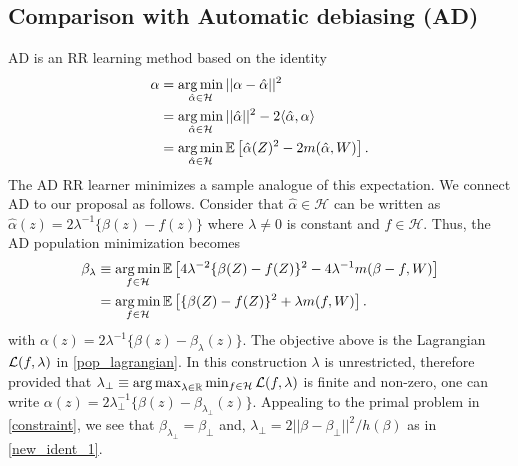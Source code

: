 

\subsection{Comparison with Automatic debiasing (AD)}

AD \citep{Chernozhukov2021, Chernozhukov2022} is an RR learning method based on the identity
\begin{align*}
    \alpha &= \operatorname*{arg\,min}_{\hat{\alpha}\in \mathcal{H}} || \alpha - \hat{\alpha}||^2 \\
    &= \operatorname*{arg\,min}_{\hat{\alpha}\in \mathcal{H}} || \hat{\alpha}||^2 -2 \langle \hat{\alpha}, \alpha \rangle \\
    &= \operatorname*{arg\,min}_{\hat{\alpha}\in \mathcal{H}} \mathbb{E}\left[\hat{\alpha}(Z)^2 - 2m(\hat{\alpha},W) \right].
\end{align*}
The AD RR learner minimizes a sample analogue of this expectation.
We connect AD to our proposal as follows. Consider that $\hat{\alpha}\in\mathcal{H}$ can be written as $\hat{\alpha}(z) = 2\lambda^{-1}\{\beta(z) - f(z)\}$ where $\lambda \neq 0$ is constant and $f\in \mathcal{H}$. Thus, the AD population minimization becomes
\begin{align*}
    \beta_\lambda &\equiv \operatorname*{arg\,min}_{f \in \mathcal{H}} \mathbb{E}\left[4\lambda^{-2}\{\beta(Z) - f(Z)\}^2 - 4\lambda^{-1} m(\beta - f,W) \right]\\
    &=\operatorname*{arg\,min}_{f \in \mathcal{H}} \mathbb{E}\left[\{\beta(Z) - f(Z)\}^2 + \lambda m(f,W) \right].
\end{align*}
with $\alpha(z) = 2\lambda^{-1}\{\beta(z) - \beta_\lambda(z)\}$. The objective above is the Lagrangian $\mathcal{L}(f, \lambda)$ in \eqref{pop_lagrangian}. In this construction $\lambda$ is unrestricted, therefore provided that $\lambda_\perp \equiv \operatorname*{arg\,max}_{\lambda \in \mathbb{R}}\min_{f \in \mathcal{H}} \mathcal{L}(f, \lambda)$ is finite and non-zero, one can write $\alpha(z) = 2\lambda_\perp^{-1}\{\beta(z) - \beta_{\lambda_\perp}(z)\}$. Appealing to the primal problem in \eqref{constraint}, we see that $\beta_{\lambda_\perp} = \beta_\perp$ and, $\lambda_\perp = 2 ||\beta - \beta_\perp||^2/h(\beta)$ as in \eqref{new_ident_1}.

